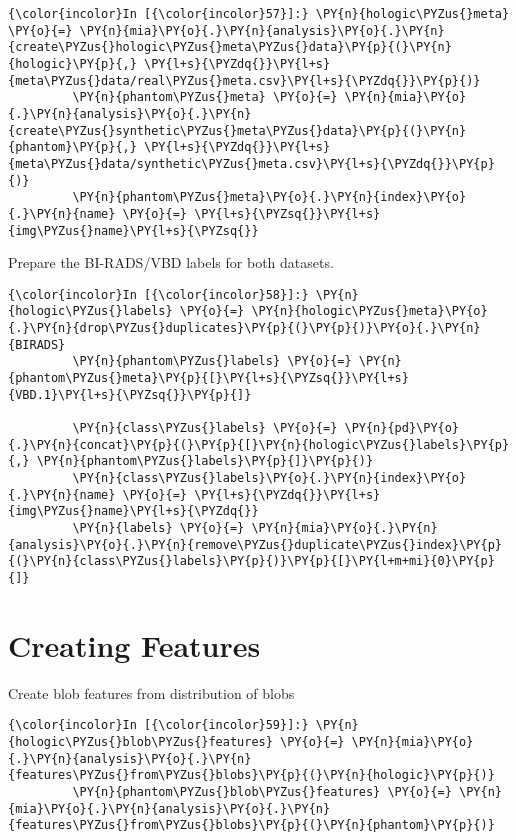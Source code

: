     \begin{Verbatim}[commandchars=\\\{\}]
{\color{incolor}In [{\color{incolor}57}]:} \PY{n}{hologic\PYZus{}meta} \PY{o}{=} \PY{n}{mia}\PY{o}{.}\PY{n}{analysis}\PY{o}{.}\PY{n}{create\PYZus{}hologic\PYZus{}meta\PYZus{}data}\PY{p}{(}\PY{n}{hologic}\PY{p}{,} \PY{l+s}{\PYZdq{}}\PY{l+s}{meta\PYZus{}data/real\PYZus{}meta.csv}\PY{l+s}{\PYZdq{}}\PY{p}{)}
         \PY{n}{phantom\PYZus{}meta} \PY{o}{=} \PY{n}{mia}\PY{o}{.}\PY{n}{analysis}\PY{o}{.}\PY{n}{create\PYZus{}synthetic\PYZus{}meta\PYZus{}data}\PY{p}{(}\PY{n}{phantom}\PY{p}{,} \PY{l+s}{\PYZdq{}}\PY{l+s}{meta\PYZus{}data/synthetic\PYZus{}meta.csv}\PY{l+s}{\PYZdq{}}\PY{p}{)}
         \PY{n}{phantom\PYZus{}meta}\PY{o}{.}\PY{n}{index}\PY{o}{.}\PY{n}{name} \PY{o}{=} \PY{l+s}{\PYZsq{}}\PY{l+s}{img\PYZus{}name}\PY{l+s}{\PYZsq{}}
\end{Verbatim}

    Prepare the BI-RADS/VBD labels for both datasets.

    \begin{Verbatim}[commandchars=\\\{\}]
{\color{incolor}In [{\color{incolor}58}]:} \PY{n}{hologic\PYZus{}labels} \PY{o}{=} \PY{n}{hologic\PYZus{}meta}\PY{o}{.}\PY{n}{drop\PYZus{}duplicates}\PY{p}{(}\PY{p}{)}\PY{o}{.}\PY{n}{BIRADS}
         \PY{n}{phantom\PYZus{}labels} \PY{o}{=} \PY{n}{phantom\PYZus{}meta}\PY{p}{[}\PY{l+s}{\PYZsq{}}\PY{l+s}{VBD.1}\PY{l+s}{\PYZsq{}}\PY{p}{]}

         \PY{n}{class\PYZus{}labels} \PY{o}{=} \PY{n}{pd}\PY{o}{.}\PY{n}{concat}\PY{p}{(}\PY{p}{[}\PY{n}{hologic\PYZus{}labels}\PY{p}{,} \PY{n}{phantom\PYZus{}labels}\PY{p}{]}\PY{p}{)}
         \PY{n}{class\PYZus{}labels}\PY{o}{.}\PY{n}{index}\PY{o}{.}\PY{n}{name} \PY{o}{=} \PY{l+s}{\PYZdq{}}\PY{l+s}{img\PYZus{}name}\PY{l+s}{\PYZdq{}}
         \PY{n}{labels} \PY{o}{=} \PY{n}{mia}\PY{o}{.}\PY{n}{analysis}\PY{o}{.}\PY{n}{remove\PYZus{}duplicate\PYZus{}index}\PY{p}{(}\PY{n}{class\PYZus{}labels}\PY{p}{)}\PY{p}{[}\PY{l+m+mi}{0}\PY{p}{]}
\end{Verbatim}

    \section{Creating Features}\label{creating-features}

    Create blob features from distribution of blobs

    \begin{Verbatim}[commandchars=\\\{\}]
{\color{incolor}In [{\color{incolor}59}]:} \PY{n}{hologic\PYZus{}blob\PYZus{}features} \PY{o}{=} \PY{n}{mia}\PY{o}{.}\PY{n}{analysis}\PY{o}{.}\PY{n}{features\PYZus{}from\PYZus{}blobs}\PY{p}{(}\PY{n}{hologic}\PY{p}{)}
         \PY{n}{phantom\PYZus{}blob\PYZus{}features} \PY{o}{=} \PY{n}{mia}\PY{o}{.}\PY{n}{analysis}\PY{o}{.}\PY{n}{features\PYZus{}from\PYZus{}blobs}\PY{p}{(}\PY{n}{phantom}\PY{p}{)}
\end{Verbatim}

